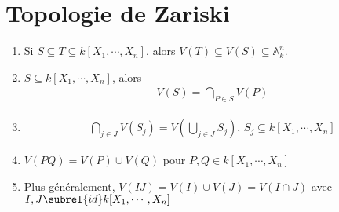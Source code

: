         \section{Topologie de Zariski}
            \begin{prop}
                \begin{enumerate}
                    \item Si $S \subseteq T \subseteq k[X_1, \cdots, X_n]$, alors $V(T) \subseteq V(S) \subseteq \mathbb{A}_k^n$.
                    \item $S \subseteq k[X_1, \cdots, X_n]$, alors
                    \begin{align*}
                        V(S) = \bigcap_{P \in S} V(P)
                    \end{align*}
                    \item
                    \begin{align*}
                        \bigcap_{j \in J} V(S_j) = V\left(\bigcup_{j \in J} S_j\right),\, S_j \subseteq k[X_1, \cdots, X_n]
                    \end{align*}
                    \item $V(PQ) = V(P) \cup V(Q)$ pour $P,Q \in k[X_1, \cdots, X_n]$
                    \item Plus généralement, $V(IJ) = V(I) \cup V(J) = V(I \cap J)$ avec $I,J \subrel{id} k[X_1, \cdots, X_n]$
                \end{enumerate}
            \end{prop}

